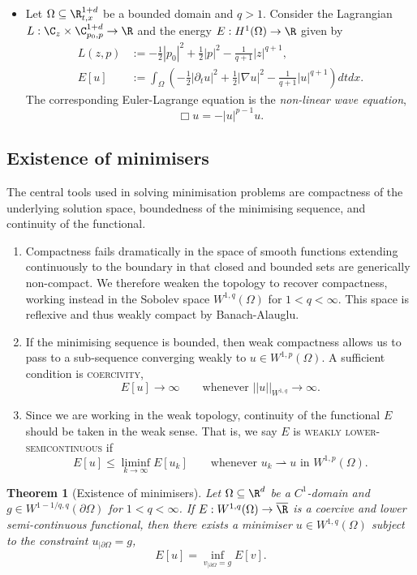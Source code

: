 \documentclass[reqno]{amsart}
\newtheorem{theorem}{Theorem}
\theoremstyle{definition}
\theoremstyle{remark}
\newcounter{problem}[section]	\declaretheorem[style=thmrecbox,name=Problem, numberlike=problem]{statement}
\renewcommand{\emph}{\textsc}
\begin{document}
\begin{itemize}
	\item Let $\Omega \subseteq \R^{1 + d}_{t, x}$ be a bounded domain and $q > 1$. Consider the Lagrangian $L : \C_z \times \C^{1 + d}_{p_0, p} \to \R$ and the energy $E: H^1 (\Omega) \to \R$ given by
			\begin{align*}
				 L(z, p) 
				 	&:= -\frac12 |p_0|^2 + \frac12 |p|^2 - \frac{1}{q + 1} |z|^{q + 1}, \\
				 E[u] 
				 	&:= \int_\Omega \left( -\frac12 |\partial_t u|^2 + \frac12 |\nabla u|^2 - \frac{1}{q + 1} |u|^{q + 1} \right) dt dx. 
			\end{align*}	 
		The corresponding Euler-Lagrange equation is the \textit{non-linear wave equation},
			\[ \Box u = - |u|^{p - 1} u. \]
			
\end{itemize}

\subsection{Existence of minimisers}

The central tools used in solving minimisation problems are compactness of the underlying solution space, boundedness of the minimising sequence, and continuity of the functional. 
\begin{enumerate}
	\item Compactness fails dramatically in the space of smooth functions extending continuously to the boundary in that closed and bounded sets are generically non-compact. We therefore weaken the topology to recover compactness, working instead in the Sobolev space $W^{1, q} (\Omega)$ for $1 < q < \infty$. This space is reflexive and thus weakly compact by Banach-Alauglu. 
	\item If the minimising sequence is bounded, then weak compactness allows us to pass to a sub-sequence converging weakly to $u \in W^{1, p} (\Omega)$. A sufficient condition is \emph{coercivity}, 
			\[ E[u] \to \infty \qquad \text{whenever } ||u||_{W^{1, q}} \to \infty. \]
	
	\item Since we are working in the weak topology, continuity of the functional $E$ should be taken in the weak sense. That is, we say $E$ is \emph{weakly lower-semicontinuous} if
	\[ E[u] \leq \liminf_{k \to \infty} E[u_k] \qquad \text{whenever $u_k \rightharpoonup u$ in $W^{1, p} (\Omega)$}. \]	
\end{enumerate}


\begin{theorem}[Existence of minimisers]
	Let $\Omega \subseteq \R^d$ be a $C^1$-domain and $g \in W^{1 - 1/q, q} (\partial \Omega)$ for $1 < q < \infty$. If $E : W^{1, q} (\Omega) \to \overline \R$ is a coercive and lower semi-continuous functional, then there exists a minimiser $u \in W^{1, q} (\Omega)$ subject to the constraint $u_{|\partial \Omega} = g$,  
		\[ E[u] = \inf_{v_{|\partial \Omega} = g} E[v]. \]
\end{theorem}
\end{document}
